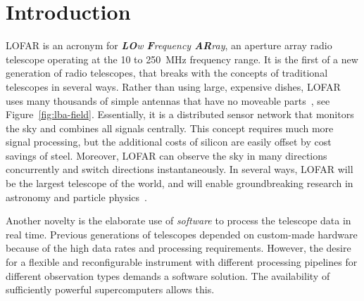 \documentclass{sig-alternate}
\begin{document}
\section{Introduction}

\begin{figure}[ht]
\end{figure}

LOFAR is an acronym for \emph{\textbf{LO}w \textbf{F}requency \textbf{AR}ray},
an aperture array radio telescope operating at the 10 to 250~MHz frequency
range.
It is the first of a new generation of radio telescopes, that breaks with
the concepts of traditional telescopes in several ways.
Rather than using large, expensive dishes, LOFAR uses many thousands of
simple antennas that have no moveable parts~\cite{Butcher:04,deVos:09}, see Figure~\ref{fig:lba-field}.
Essentially, it is a distributed sensor network that monitors the sky
and combines all signals centrally.
This concept requires much more signal processing, but the additional costs
of silicon are easily offset by cost savings of steel.
Moreover, LOFAR can observe the sky in many directions concurrently and
switch directions instantaneously.
In several ways, LOFAR will be the largest telescope of the world, and will
enable groundbreaking research in astronomy and particle
physics~\cite{Bruyn:02}.

Another novelty is the elaborate use of \emph{software\/} to process
the telescope data in real time.
Previous generations of telescopes depended on custom-made hardware
because of the high data rates and processing requirements.
However, the desire for a flexible and reconfigurable instrument with
different processing pipelines for different observation types demands a
software solution.
The availability of sufficiently powerful supercomputers allows this.
\end{document}
